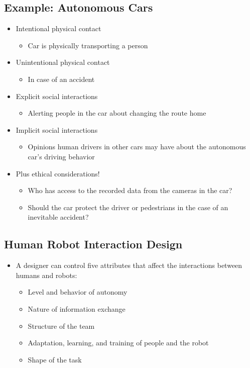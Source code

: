 \documentclass[10pt]{article}
\begin{document}
\subsection*{Example: Autonomous Cars}
\begin{itemize}
	\item Intentional physical contact
	\begin{itemize}
        \item Car is physically transporting a person
    \end{itemize}
	\item Unintentional physical contact
	\begin{itemize}
        \item In case of an accident
    \end{itemize}
	\item Explicit social interactions
	\begin{itemize}
        \item Alerting people in the car about changing the route home
    \end{itemize}
	\item Implicit social interactions
	\begin{itemize}
        \item Opinions human drivers in other cars may have about the autonomous car's driving behavior
    \end{itemize}
	\item Plus ethical considerations!
	\begin{itemize}
        \item Who has access to the recorded data from the cameras in the car?
        \item Should the car protect the driver or pedestrians in the case of an inevitable accident?
    \end{itemize} 
\end{itemize}

\subsection*{Human Robot Interaction Design}
\begin{itemize}
	\item A designer can control five attributes that affect the interactions between humans and robots:
	\begin{itemize}
        \item Level and behavior of autonomy
        \item Nature of information exchange
        \item Structure of the team
        \item Adaptation, learning, and training of people and the robot
        \item Shape of the task
    \end{itemize}
\end{itemize}
\end{document}
